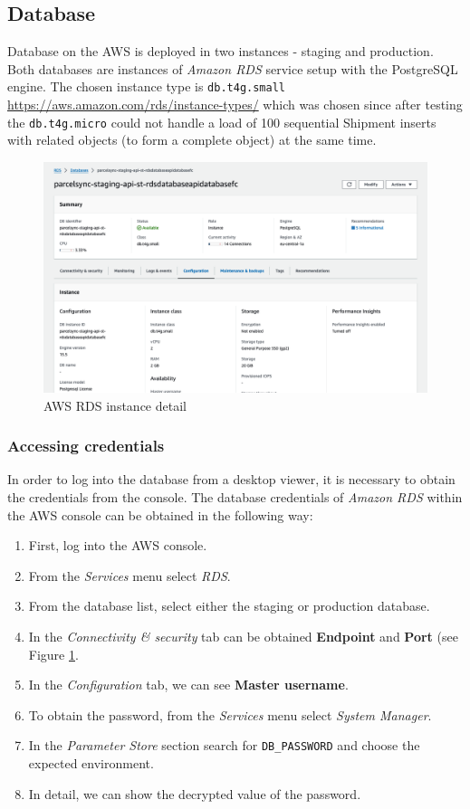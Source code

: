 \subsection{Database}
Database on the AWS is deployed in two instances - staging and production.
Both databases are instances of \textit{Amazon RDS} service setup with the PostgreSQL engine.
The chosen instance type is \texttt{db.t4g.small} \url{https://aws.amazon.com/rds/instance-types/} which was chosen since after testing the \texttt{db.t4g.micro} could not handle a load of 100 sequential Shipment inserts with related objects (to form a complete object) at the same time.

\begin{figure}[H]\centering
\includegraphics[width=140mm]{img/docs/fig_aws_rds.png}
\caption{AWS RDS instance detail}
\label{img:admin-manual-aws.rds.detail}
\end{figure}

\subsubsection{Accessing credentials}
In order to log into the database from a desktop viewer, it is necessary to obtain the credentials from the console. 
The database credentials of \textit{Amazon RDS} within the AWS console can be obtained in the following way:
\begin{enumerate}
    \item First, log into the AWS console.
    \item From the \textit{Services} menu select \textit{RDS}.
    \item From the database list, select either the staging or production database.
    \item In the \textit{Connectivity \& security} tab can be obtained \textbf{Endpoint} and \textbf{Port} (see Figure \ref{img:admin-manual-aws.rds.detail}.
    \item In the \textit{Configuration} tab, we can see \textbf{Master username}.
    \item To obtain the password, from the \textit{Services} menu select \textit{System Manager}.
    \item In the \textit{Parameter Store} section search for \texttt{DB\_PASSWORD} and choose the expected environment.
    \item In detail, we can show the decrypted value of the password.
\end{enumerate}


